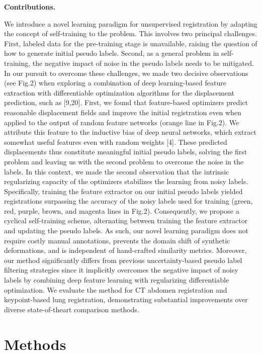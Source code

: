 \textbf{Contributions.}

We introduce a novel learning paradigm for unsupervised registration by adapting the concept of self-training to the problem. This involves two principal challenges. First, labeled data for the pre-training stage is unavailable, raising the question of how to generate initial pseudo labels. Second, as a general problem in self-training, the negative impact of noise in the pseudo labels needs to be mitigated. In our pursuit to overcome these challenges, we made two decisive observations (see Fig.2) when exploring a combination of deep learning-based feature extraction with differentiable optimization algorithms for the displacement prediction, such as [9,20]. First, we found that feature-based optimizers predict reasonable displacement fields and improve the initial registration even when applied to the output of random feature networks (orange line in Fig.2). We attribute this feature to the inductive bias of deep neural networks, which extract somewhat useful features even with random weights [4]. These predicted displacements thus constitute meaningful initial pseudo labels, solving the first problem and leaving us with the second problem to overcome the noise in the labels. In this context, we made the second observation that the intrinsic regularizing capacity of the optimizers stabilizes the learning from noisy labels. Specifically, training the feature extractor on our initial pseudo labels yielded registrations surpassing the accuracy of the noisy labels used for training (green, red, purple, brown, and magenta lines in Fig.2). Consequently, we propose a cyclical self-training scheme, alternating between training the feature extractor and updating the pseudo labels. As such, our novel learning paradigm does not require costly manual annotations, prevents the domain shift of synthetic deformations, and is independent of hand-crafted similarity metrics. Moreover, our method significantly differs from previous uncertainty-based pseudo label filtering strategies since it implicitly overcomes the negative impact of noisy labels by combining deep feature learning with regularizing differentiable optimization. We evaluate the method for CT abdomen registration and keypoint-based lung registration, demonstrating substantial improvements over diverse state-of-theart comparison methods.

\section{Methods}

